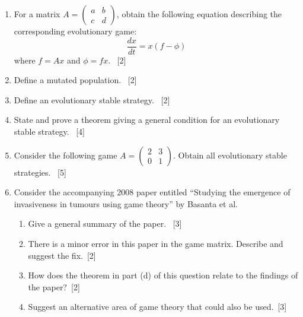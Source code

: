 \documentclass[12pt,a4paper]{article}
\makeatletter
\renewcommand{\@oddfoot}{\hfil \arabic{page} \hfil}    %
\makeatother
\begin{document}
\begin{enumerate}
    \begin{enumerate}
        \item For a matrix \(A=\begin{pmatrix}a&b\\c &d\end{pmatrix}\), obtain
              the following equation describing the corresponding evolutionary
              game:
              \[\frac{dx}{dt}=x(f-\phi)\]
              where \(f=Ax\) and \(\phi=fx\).
              ~\hfill{[2]}
        \item Define a mutated population.
              ~\hfill{[2]}
        \item Define an evolutionary stable strategy.
              ~\hfill{[2]}
        \item State and prove a theorem giving a general condition for an
            evolutionary stable strategy.
              ~\hfill{[4]}
        \item Consider the following game
        \(A=\begin{pmatrix}2&3\\0 &1\end{pmatrix}\). Obtain all evolutionary
            stable strategies.
              ~\hfill{[5]}
         \item Consider the accompanying 2008 paper entitled ``Studying the
             emergence of invasiveness in tumours using game theory'' by Basanta
             et al.
             \begin{enumerate}
                 \item Give a general summary of the paper.
                     ~\hfill{[3]}
                 \item There is a minor error in this paper in the game matrix.
                     Describe and suggest the fix.~\hfill{[2]}
                 \item How does the theorem in part (d) of this question relate to
                     the findings of the paper?~\hfill{[2]}
                 \item Suggest an alternative area of game theory that could
                     also be used.~\hfill{[3]}
             \end{enumerate}
     \end{enumerate}
 \end{enumerate}

\makeatletter
\renewcommand{\@oddfoot}{\hfil \arabic{page}X \hfil}    %
\makeatother
\end{document}
